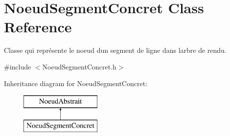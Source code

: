 \hypertarget{class_noeud_segment_concret}{}\section{Noeud\+Segment\+Concret Class Reference}
\label{class_noeud_segment_concret}


Classe qui représente le noeud d\textquotesingle{}un segment de ligne dans l\textquotesingle{}arbre de rendu.  




{\ttfamily \#include $<$Noeud\+Segment\+Concret.\+h$>$}

Inheritance diagram for Noeud\+Segment\+Concret\+:\begin{figure}[H]
\begin{center}
\leavevmode
\includegraphics[height=2.000000cm]{class_noeud_segment_concret}
\end{center}
\end{figure}
